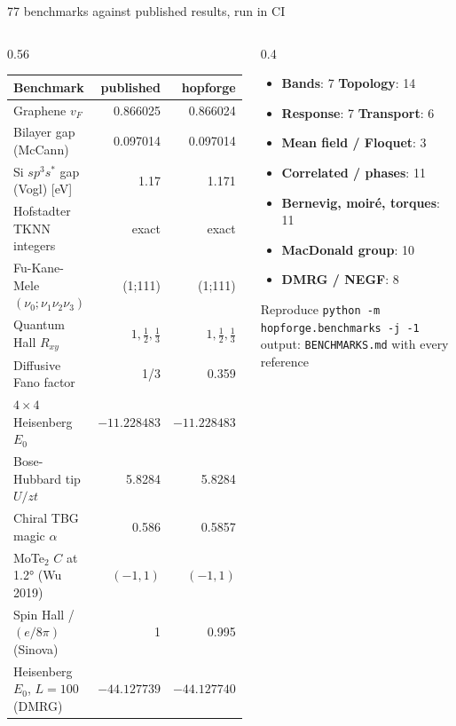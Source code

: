 \documentclass[aspectratio=169,11pt]{beamer}
\begin{document}
\begin{frame}{77 benchmarks against published results, run in CI}
\begin{columns}[T]
\begin{column}{0.56\textwidth}
\scriptsize
\renewcommand{\arraystretch}{1.02}
\begin{tabular}{@{}lrr@{}}
\toprule
\textbf{Benchmark} & \textbf{published} & \textbf{hopforge}\\\midrule
Graphene $v_F$ & 0.866025 & 0.866024\\
Bilayer gap (McCann) & 0.097014 & 0.097014\\
Si $sp^3s^*$ gap (Vogl) [eV] & 1.17 & 1.171\\
Hofstadter TKNN integers & exact & exact\\
Fu-Kane-Mele $(\nu_0;\nu_1\nu_2\nu_3)$ & (1;111) & (1;111)\\
Quantum Hall $R_{xy}$ & $1,\tfrac12,\tfrac13$ & $1,\tfrac12,\tfrac13$\\
Diffusive Fano factor & 1/3 & 0.359\\
$4\times4$ Heisenberg $E_0$ & $-11.228483$ & $-11.228483$\\
Bose-Hubbard tip $U/zt$ & 5.8284 & 5.8284\\
Chiral TBG magic $\alpha$ & 0.586 & 0.5857\\
MoTe$_2$ $C$ at 1.2° (Wu 2019) & $(-1,1)$ & $(-1,1)$\\
Spin Hall / $(e/8\pi)$ (Sinova) & 1 & 0.995\\
Heisenberg $E_0$, $L=100$ (DMRG) & $-44.127739$ & $-44.127740$\\
\bottomrule
\end{tabular}
\end{column}
\begin{column}{0.4\textwidth}
\small
\begin{itemize}
\item \textbf{Bands}: 7 \quad \textbf{Topology}: 14
\item \textbf{Response}: 7 \quad \textbf{Transport}: 6
\item \textbf{Mean field / Floquet}: 3
\item \textbf{Correlated / phases}: 11
\item \textbf{Bernevig, moiré, torques}: 11
\item \textbf{MacDonald group}: 10
\item \textbf{DMRG / NEGF}: 8
\end{itemize}
\vspace{6pt}
\begin{block}{Reproduce}
\texttt{\footnotesize python -m hopforge.benchmarks -j -1}\\
\scriptsize output: \texttt{BENCHMARKS.md} with every reference
\end{block}
\end{column}
\end{columns}
\end{frame}
\end{document}
